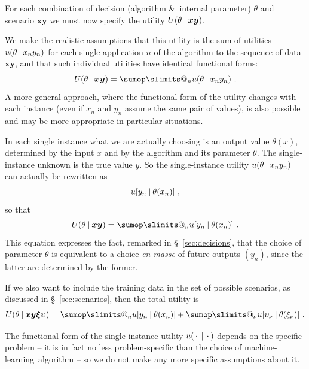 \documentclass[\ifafour a4paper,12pt,\else a5paper,10pt,\fi%
onecolumn,oneside,article,%
british%
]{memoir}
\makeatletter
\theoremstyle{remark}
\theoremstyle{innote}
\def\sum{\DOTSI\sumop\slimits@}
\newcommand*{\amp}{\&}
\newcommand*{\dotv}{\mathord{\,\cdot\,}}%
\renewcommand*{\|}[1][]{\nonscript\:#1\vert\nonscript\:\mathopen{}}
\newcommand*{\sect}{\S}%
\newcommand*{\ml}{machine-learning}
\newcommand*{\xx}[1]{x_{#1}}
\newcommand*{\yy}[1]{y_{#1}}
\newcommand*{\bz}{\bm{xy}}
\newcommand*{\xxx}[1]{\xi_{#1}}
\newcommand*{\yyy}[1]{\upsilon_{#1}}
\newcommand*{\bzz}{\bm{\xi\upsilon}}
\makeatother
\begin{document}
For each combination of decision (algorithm \amp\ internal parameter)
$\theta$ and scenario $\bz$ we must now specify the utility
$U(\theta \| \bz)$.

We make the realistic assumptions that this utility is the sum of utilities
$u(\theta \| \xx{n}\yy{n})$ for each single application $n$ of the
algorithm to the sequence of data $\bz$, and that such individual utilities
have identical functional forms:
\begin{equation}
  \label{eq:total_utility}
  U(\theta \| \bz) = \sum_{n} u(\theta \| \xx{n}\yy{n}) \ .
\end{equation}
A more general approach, where the functional form of the utility changes
with each instance (even if $\xx{n}$ and $\yy{n}$ assume the same pair of
values), is also possible and may be more appropriate in particular
situations.

In each single instance what we are actually choosing is an output value
$\theta(x)$, determined by the input $x$ and by the algorithm and its
parameter $\theta$. The single-instance unknown is the true value $y$. So
the single-instance utility $u(\theta \| \xx{n}\yy{n})$ can actually be
rewritten as
\begin{equation}
  \label{eq:utility_singleinstance}
  u[\yy{n} \| \theta(\xx{n})] \ ,
\end{equation}
so that
\begin{equation}
  \label{eq:total_utility_final}
  U(\theta \| \bz) = \sum_{n} u[\yy{n} \| \theta(\xx{n})] \ .
\end{equation}
This equation expresses the fact, remarked in \sect~\ref{sec:decisions},
that the choice of parameter $\theta$ is equivalent to a choice \emph{en
  masse} of future outputs $(\yy{n})$, since the latter are determined by
the former.

If we also want to include the training data in the set of possible
scenarios, as discussed in \sect~\ref{sec:scenarios}, then the total
utility is
\begin{equation}
  \label{eq:total_utility_final_withtraining}
  U(\theta \| \bz\bzz) = \sum_{n} u[\yy{n} \| \theta(\xx{n})]
 +  \sum_{\nu} u[\yyy{\nu} \| \theta(\xxx{\nu})] \ .
\end{equation}

The functional form of the single-instance utility $u(\dotv\|\dotv)$
depends on the specific problem -- it is in fact no less problem-specific
than the choice of \ml\ algorithm -- so we do not make any more specific
assumptions about it.
\end{document}
